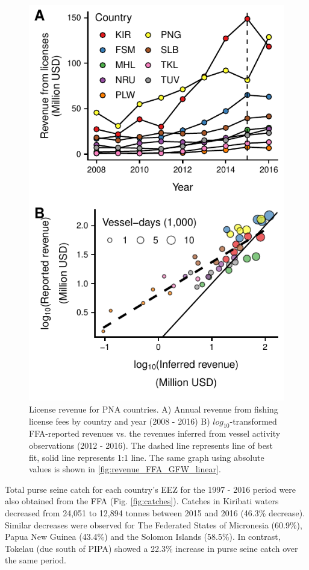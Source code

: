 \documentclass[9p,twocolumn,twoside,lineno]{pnas-new}
\begin{document}
\begin{figure}[ht]
\centering
	\includegraphics{img/revenues.pdf}
	\caption{\label{fig:revenues}
		License revenue for PNA countries. A) Annual revenue from fishing license fees by country and year (2008 - 2016) B) $log_{10}$-transformed FFA-reported revenues vs. the revenues inferred from vessel activity observations (2012 - 2016). The dashed line represents line of best fit, solid line represents 1:1 line. The same graph using absolute values is shown in \ref{fig:revenue_FFA_GFW_linear}.}
\end{figure}

Total purse seine catch for each country's EEZ for the 1997 - 2016 period were also obtained from the FFA (Fig. \ref{fig:catches}). Catches in Kiribati waters decreased from 24,051 to 12,894 tonnes between 2015 and 2016 (46.3\% decrease). Similar decreases were observed for The Federated States of Micronesia (60.9\%), Papua New Guinea (43.4\%) and the Solomon Islands (58.5\%). In contrast, Tokelau (due south of PIPA) showed a 22.3\% increase in purse seine catch over the same period.
\end{document}
